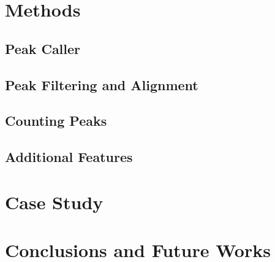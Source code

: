 \documentclass[b5paper,oneside,british,intoc,bibliograph=totoc,index=totoc,BCOR10mm,twoside,openright]{book}
\numberwithin{equation}{section}
\numberwithin{figure}{section}
\begin{document}
\section{Methods} \label{sec:descan2methods}


\subsection{Peak Caller} \label{sec:descan2peakcall}


\subsection{Peak Filtering and Alignment} \label{sec:descan2filtering}


\subsection{Counting Peaks} \label{sec:descan2peakcounts}


\subsection{Additional Features} \label{sec:descan2addfeat}


\section{Case Study} \label{sec:descan2results}


\section{Conclusions and Future Works} \label{sec:descan2next}

\end{document}
